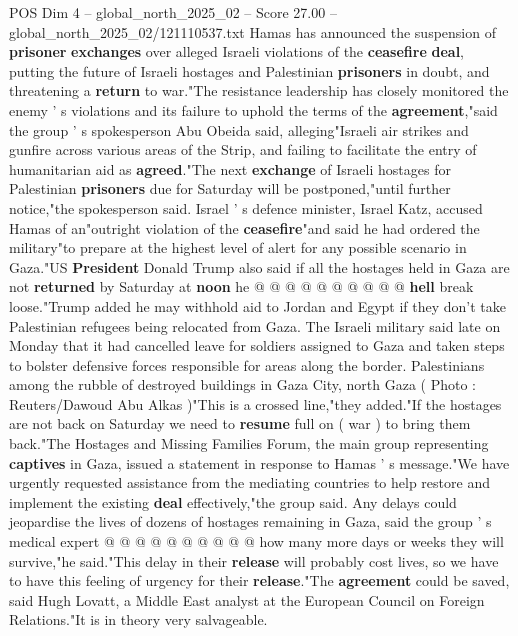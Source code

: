 \begin{textsample}{POS Dim 4 – global\_north\_2025\_02 – Score 27.00 – global\_north\_2025\_02/121110537.txt}  \label{ex:f4_pos_057}
Hamas has announced the suspension of \textbf{prisoner} \textbf{exchanges} over alleged Israeli violations of the \textbf{ceasefire} \textbf{deal}, putting the future of Israeli hostages and Palestinian \textbf{prisoners} in doubt, and threatening a \textbf{return} to war."The resistance leadership has closely monitored the enemy ' s violations and its failure to uphold the terms of the \textbf{agreement},"said the group ' s spokesperson Abu Obeida said, alleging"Israeli air strikes and gunfire across various areas of the Strip, and failing to facilitate the entry of humanitarian aid as \textbf{agreed}."The next \textbf{exchange} of Israeli hostages for Palestinian \textbf{prisoners} due for Saturday will be postponed,"until further notice,"the spokesperson said.
Israel ' s defence minister, Israel Katz, accused Hamas of an"outright violation of the \textbf{ceasefire}"and said he had ordered the military"to prepare at the highest level of alert for any possible scenario in Gaza."US \textbf{President} Donald Trump also said if all the hostages held in Gaza are not \textbf{returned} by Saturday at \textbf{noon} he @ @ @ @ @ @ @ @ @ @ \textbf{hell} break loose."Trump added he may withhold aid to Jordan and Egypt if they don't take Palestinian refugees being relocated from Gaza.
The Israeli military said late on Monday that it had cancelled leave for soldiers assigned to Gaza and taken steps to bolster defensive forces responsible for areas along the border.
Palestinians among the rubble of destroyed buildings in Gaza City, north Gaza ( Photo : Reuters/Dawoud Abu Alkas )"This is a crossed line,"they added."If the hostages are not back on Saturday we need to \textbf{resume} full on ( war ) to bring them back."The Hostages and Missing Families Forum, the main group representing \textbf{captives} in Gaza, issued a statement in response to Hamas ' s message."We have urgently requested assistance from the mediating countries to help restore and implement the existing \textbf{deal} effectively,"the group said.
Any delays could jeopardise the lives of dozens of hostages remaining in Gaza, said the group ' s medical expert @ @ @ @ @ @ @ @ @ @ how many more days or weeks they will survive,"he said."This delay in their \textbf{release} will probably cost lives, so we have to have this feeling of urgency for their \textbf{release}."The \textbf{agreement} could be saved, said Hugh Lovatt, a Middle East analyst at the European Council on Foreign Relations."It is in theory very salvageable.

\end{textsample}
